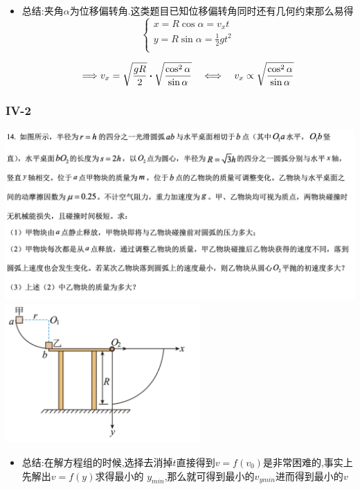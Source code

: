 \documentclass{article}
\begin{document}
    \begin{itemize}
        \item 总结:夹角$\alpha$为位移偏转角.这类题目已知位移偏转角同时还有几何约束那么易得
        $$
        \begin{cases}
            x = R \cos{\alpha} = v_{x} t \\
            y = R \sin{\alpha} = \frac{1}{2} g t^{2} \\
        \end{cases}
        $$

        $$
        \lra v_{x} = \sqrt{\frac{gR}{2}} \vdot \sqrt{\frac{\cos^{2}{\alpha}}{\sin{\alpha}}} \quad  \llra \quad  v_{x}  \propto  \sqrt{\frac{\cos^{2}{\alpha}}{\sin{\alpha}}}
        $$

    \end{itemize}

    \subsubsection{IV-2}
    \includegraphics[width=50em,keepaspectratio]{./pictures/1.2-6.png} \\
    \includegraphics[width=20em,keepaspectratio]{./pictures/1.2-7.png}

    \begin{itemize}
        \item 总结:\quad 在解方程组的时候,选择去消掉$t$直接得到$v = f(v_{0})$是非常困难的,事实上先解出$v = f(y)$求得最小的
                  $y_{min}$,那么就可得到最小的$v_{ymin}$进而得到最小的$v$
    \end{itemize}
    
\end{document}
